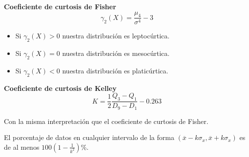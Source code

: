 \textbf{Coeficiente de curtosis de Fisher}
$$\gamma_2(X) = \dfrac{\mu_4}{\sigma^4} - 3$$
\begin{itemize}
    \item Si $\gamma_2(X) > 0$ nuestra distribución es leptocúrtica.
    \item Si $\gamma_2(X) = 0$ nuestra distribución es mesocúrtica.
    \item Si $\gamma_2(X) < 0$ nuestra distribución es platicúrtica.
\end{itemize}

\textbf{Coeficiente de curtosis de Kelley}
$$K = \dfrac{1}{2} \dfrac{Q_3 - Q_1}{D_9 - D_1} - 0.263$$

Con la misma interpretación que el coeficiente de curtosis de Fisher.\\


\begin{teo}
    El porcentaje de datos en cualquier intervalo de la forma $(\overline{x} - k\sigma_x, \overline{x}+k\sigma_x)$ es de al menos $100(1-\frac{1}{k^2})$\%.
\end{teo}